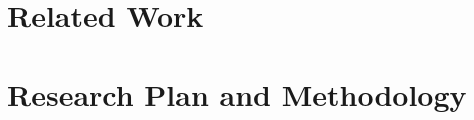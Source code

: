 \documentclass[12pt,notitlepage]{article}
\title{\vskip -5ex \large \textbf{Something Interesting and Exciting}}
\date{\vskip -3ex}
\author{Zhiya Zuo\\\textit{Prepared for Early-Career Scheme 21/22}}
\begin{document}
\begin{titlingpage}
    \maketitle
    
\end{titlingpage}


\clearpage

\clearpage

\clearpage

\clearpage

\clearpage
{}
\setcounter{page}{1}



\section{Related Work}
\smallskip

\bigskip
\section{Research Plan and Methodology}
\smallskip

\end{document}
